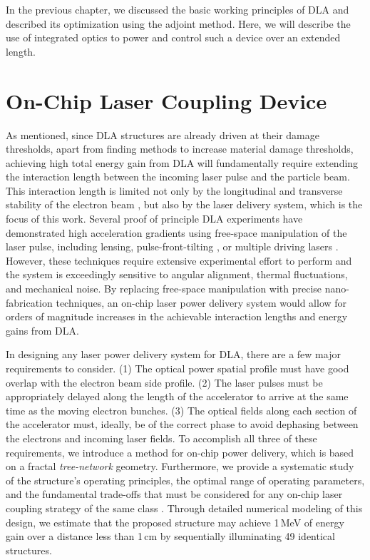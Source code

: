 
In the previous chapter, we discussed the basic working principles of DLA and described its optimization using the adjoint method.
Here, we will describe the use of integrated optics to power and control such a device over an extended length.

\section{On-Chip Laser Coupling Device}

As mentioned, since DLA structures are already driven at their damage thresholds, apart from finding methods to increase material damage thresholds, achieving high total energy gain from DLA will fundamentally require extending the interaction length between the incoming laser pulse and the particle beam.
This interaction length is limited not only by the longitudinal and transverse stability of the electron beam \cite{niedermayer2017beam, naranjo2012stable}, but also by the laser delivery system, which is the focus of this work.
Several proof of principle DLA experiments \cite{wootton2017recent, peralta2013demonstration} have demonstrated high acceleration gradients using free-space manipulation of the laser pulse, including lensing, pulse-front-tilting \cite{hebling1996derivation, akturk2004pulse, cesar2018optical}, or multiple driving lasers \cite{kenleedle, mcneur2016elements}.
However, these techniques require extensive experimental effort to perform and the system is exceedingly sensitive to angular alignment, thermal fluctuations, and mechanical noise.
By replacing free-space manipulation with precise nano-fabrication techniques, an on-chip laser power delivery system would allow for orders of magnitude increases in the achievable interaction lengths and energy gains from DLA.

In designing any laser power delivery system for DLA, there are a few major requirements to consider.
(1) The optical power spatial profile must have good overlap with the electron beam side profile.
(2) The laser pulses must be appropriately delayed along the length of the accelerator to arrive at the same time as the moving electron bunches.
(3) The optical fields along each section of the accelerator must, ideally, be of the correct phase to avoid dephasing between the electrons and incoming laser fields.
To accomplish all three of these requirements, we introduce a method for on-chip power delivery, which is based on a fractal \textit{tree-network} geometry.
Furthermore, we provide a systematic study of the structure's operating principles, the optimal range of operating parameters, and the fundamental trade-offs that must be considered for any on-chip laser coupling strategy of the same class \cite{hughes_-chip_2018}.
Through detailed numerical modeling of this design, we estimate that the proposed structure may achieve 1\,MeV of energy gain over a distance less than 1\,cm by sequentially illuminating 49 identical structures.

